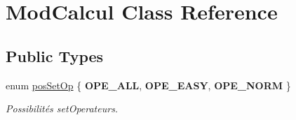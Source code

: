 \hypertarget{class_mod_calcul}{}\section{Mod\+Calcul Class Reference}
\label{class_mod_calcul}
\subsection*{Public Types}
\begin{DoxyCompactItemize}
\item 
\mbox{\label{class_mod_calcul_a6c7aa1fa9a9cf577567da286e26596ce}} 
enum \hyperlink{class_mod_calcul_a6c7aa1fa9a9cf577567da286e26596ce}{pos\+Set\+Op} \{ {\bfseries O\+P\+E\+\_\+\+A\+LL}, 
{\bfseries O\+P\+E\+\_\+\+E\+A\+SY}, 
{\bfseries O\+P\+E\+\_\+\+N\+O\+RM}
 \}\begin{DoxyCompactList}\small\item\em Possibilités set\+Operateurs. \end{DoxyCompactList}
\end{DoxyCompactItemize}
